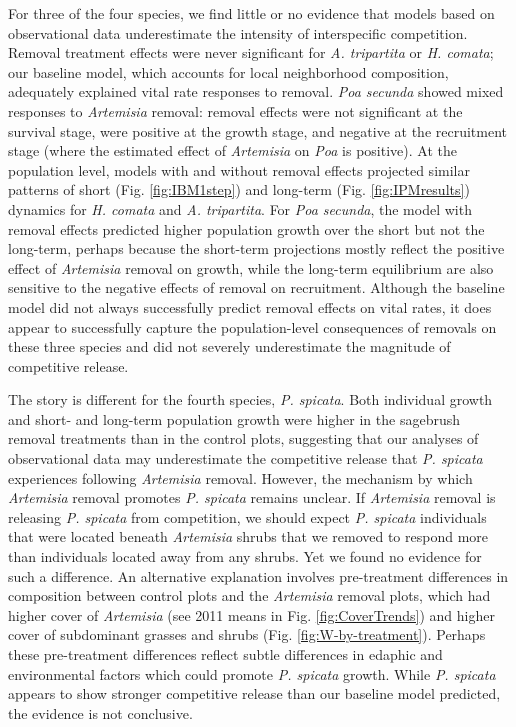 \documentclass[11pt]{article}
\begin{document}
\begin{doublespacing}
{For three of the four species, we find little or no evidence that models based on observational data underestimate the intensity of interspecific competition. Removal treatment effects were never significant for \textit{A. tripartita} or \textit{H. comata}; our baseline model, which accounts for local neighborhood composition, adequately explained vital rate responses to  removal.  \textit{Poa secunda} showed mixed responses to \textit{Artemisia} removal: removal effects were not significant at the survival stage, were positive at the growth stage, and negative at the recruitment stage (where the estimated effect of \textit{Artemisia} on \textit{Poa} is positive). At the population level, models with and without removal effects projected similar patterns of short (Fig. \ref{fig:IBM1step}) and long-term (Fig. \ref{fig:IPMresults}) dynamics for \textit{H. comata} and \textit{A. tripartita}. For \textit{Poa secunda}, the model with removal effects predicted higher population growth over the short but not the long-term, perhaps because the short-term projections mostly reflect the positive effect of \textit{Artemisia} removal on growth, while the long-term equilibrium are also sensitive to the negative effects of removal on recruitment. Although the baseline model did not always successfully predict removal effects on vital rates, it does appear to successfully capture the population-level consequences of removals on these three species and did not severely underestimate the magnitude of competitive release.

The story is different for the fourth species, \textit{P. spicata}. Both individual growth and short- and long-term population growth were higher in the sagebrush removal treatments than in the control plots, suggesting that our analyses of observational data may underestimate the competitive release that \textit{P. spicata} experiences following \textit{Artemisia} removal. However, the mechanism by which \textit{Artemisia} removal promotes \textit{P. spicata} remains unclear. If  \textit{Artemisia} removal is releasing \textit{P. spicata} from competition, we should expect \textit{P. spicata} individuals that were located beneath \textit{Artemisia} shrubs that we removed to respond more than individuals located away from any shrubs. Yet we found no evidence for such a difference. An alternative explanation involves pre-treatment differences in composition between control plots and  the \textit{Artemisia} removal  plots, which had higher cover of \textit{Artemisia} (see 2011 means in Fig. \ref{fig:CoverTrends}) and higher cover of subdominant grasses and shrubs (Fig. \ref{fig:W-by-treatment}). Perhaps these pre-treatment differences reflect subtle differences in edaphic and environmental factors which could promote \textit{P. spicata} growth. While \textit{P. spicata} appears to show stronger competitive release than our baseline model predicted, the evidence is not conclusive. 

}
\end{doublespacing}
\end{document}

